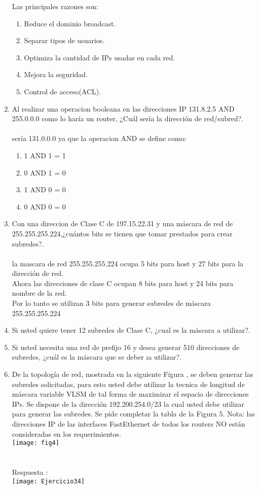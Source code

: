 \documentclass{udparticle}
\begin{document}
\begin{enumerate}
Las principales razones son:
\begin{enumerate}
\item Reduce el dominio broadcast.
\item Separar tipos de usuarios.
\item Optimiza la cantidad de IPs usadas en cada red.
\item Mejora la seguridad.
\item Control de acceso(ACL).
\end{enumerate}
\item Al realizar una operacion booleana en las direcciones IP 
131.8.2.5 AND 255.0.0.0 como lo haría un router, ¿Cuál sería la 
dirección de red/subred?.\\\\
sería 131.0.0.0 ya que la operacion AND se define como:
\begin{enumerate}
\item 1 AND 1 = 1
\item 0 AND 1 = 0
\item 1 AND 0 = 0
\item 0 AND 0 = 0
\end{enumerate}

\item Con una direccion de Clase C de 197.15.22.31 y una máscara de red
de 255.255.255.224,¿cuántos bits se tienen que tomar prestados para 
crear subredes?.\\\\
la mascara de red 255.255.255.224 ocupa 5 bits para host y 27 bits para la dirección de  red.\\
Ahora las direcciones de clase C ocupan 8 bits para host y 24 bits para nombre de la red.\\
Por lo tanto se utilizan 3 bits para generar subredes de máscara 255.255.255.224
\item Si usted quiere tener 12 subredes de Clase C, ¿cual es 
la máscara a utilizar?.
\item Si usted necesita una red de prefijo 16 y desea generar 
510 direcciones de subredes, ¿cuál es la máscara que se deber 
ıa utilizar?.
\item De la topología de red, mostrada en la siguiente Figura , se deben generar
las subredes solicitadas, para esto usted debe utilizar la tecnica de 
longitud de máscara variable VLSM de tal forma de maximizar el 
espacio de direcciones IPs. Se dispone de la dirección 
192.200.254.0/23 la cual usted debe utilizar para generar las 
subredes. Se pide completar la tabla de la Figura 5. Nota: las 
direcciones IP de las interfaces FastEthernet de todos los routers NO están consideradas en los requerimientos.\\
\texttt{[image: fig4]}
\\\\\\
Respuesta :\\
\texttt{[image: Ejercicio34]}


\end{enumerate}
\end{document}
